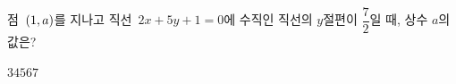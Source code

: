 점~$(1{,}\mkern3mu a)$를 지나고 직선~$2x+5y+1=0$에 수직인 직선의 $y$절편이 $\dfrac{7}{2}$일 때, 상수 $a$의 값은?
\begin{choices32}{$3$}{$4$}{$5$}{$6$}{$7$}\end{choices32}
